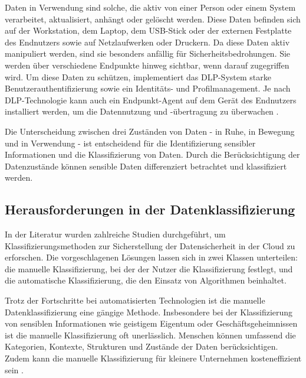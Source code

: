 Daten in Verwendung sind solche, die aktiv von einer Person oder einem System verarbeitet, aktualisiert, anhängt oder gelöscht werden. Diese Daten befinden sich auf der Workstation, dem Laptop, dem USB-Stick oder der externen Festplatte des Endnutzers sowie auf Netzlaufwerken oder Druckern. Da diese Daten aktiv manipuliert werden, sind sie besonders anfällig für Sicherheitsbedrohungen. Sie werden über verschiedene Endpunkte hinweg sichtbar, wenn darauf zugegriffen wird. Um diese Daten zu schützen, implementiert das DLP-System starke Benutzerauthentifizierung sowie ein Identitäts- und Profilmanagement. Je nach DLP-Technologie kann auch ein Endpunkt-Agent auf dem Gerät des Endnutzers installiert werden, um die Datennutzung und -übertragung zu überwachen \cite{Shabtai.2012b}\cite{Shishodia.2022}.

Die Unterscheidung zwischen drei Zuständen von Daten - in Ruhe, in Bewegung und in Verwendung - ist entscheidend für die Identifizierung sensibler Informationen und die Klassifizierung von Daten. Durch die Berücksichtigung der Datenzustände können sensible Daten differenziert betrachtet und klassifiziert werden.

\subsection{Herausforderungen in der Datenklassifizierung}
In der Literatur wurden zahlreiche Studien durchgeführt, um Klassifizierungsmethoden zur Sicherstellung der Datensicherheit in der Cloud zu erforschen. Die vorgeschlagenen Lösungen lassen sich in zwei Klassen unterteilen: die manuelle Klassifizierung, bei der der Nutzer die Klassifizierung festlegt, und die automatische Klassifizierung, die den Einsatz von Algorithmen beinhaltet.

Trotz der Fortschritte bei automatisierten Technologien ist die manuelle Datenklassifizierung eine gängige Methode. Insbesondere bei der Klassifizierung von sensiblen Informationen wie geistigem Eigentum oder Geschäftsgeheimnissen ist die manuelle Klassifizierung oft unerlässlich. Menschen können umfassend die Kategorien, Kontexte, Strukturen und Zustände der Daten berücksichtigen. Zudem kann die manuelle Klassifizierung für kleinere Unternehmen kosteneffizient sein  \cite{Divadari.2023}\cite{Alsuwaie.2021}.

